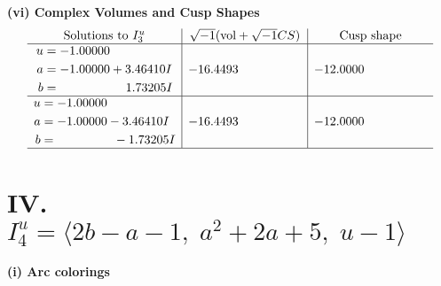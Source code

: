 \documentclass[1p]{elsarticle_modified}
\theoremstyle{definition}
\newcommand{\I}{\sqrt{-1}}
\begin{document}
\newpage\flushleft \textbf{(vi) Complex Volumes and Cusp Shapes}
$$\begin{array}{c|c|c}  
\text{Solutions to }I^u_{3}& \I (\text{vol} + \sqrt{-1}CS) & \text{Cusp shape}\\
 \hline 
\begin{aligned}
u &= -1.00000\phantom{ +0.000000I} \\
a &= -1.00000 + 3.46410 I \\
b &= \phantom{-0.000000 -}1.73205 I\end{aligned}
 & -16.4493\phantom{ +0.000000I} & -12.0000\phantom{ +0.000000I} \\ \hline\begin{aligned}
u &= -1.00000\phantom{ +0.000000I} \\
a &= -1.00000 - 3.46410 I \\
b &= \phantom{-0.000000 } -1.73205 I\end{aligned}
 & -16.4493\phantom{ +0.000000I} & -12.0000\phantom{ +0.000000I}\\
 \hline 
 \end{array}$$\newpage\newpage\renewcommand{\arraystretch}{1}
\centering \section*{IV. $I^u_{4}= \langle 2 b- a-1,\;a^2+2 a+5,\;u-1 \rangle$}
\flushleft \textbf{(i) Arc colorings}\\
\end{document}
